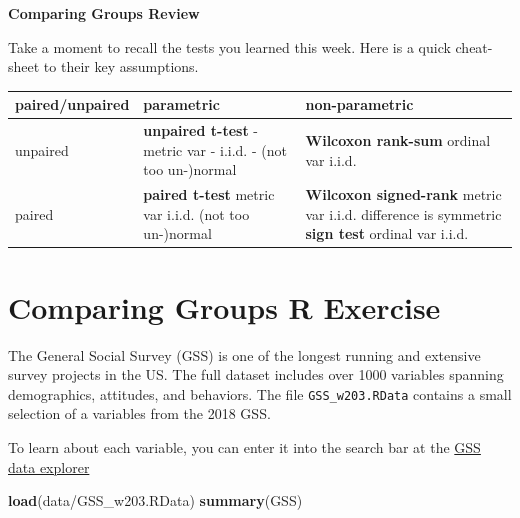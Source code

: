 \documentclass[
]{book}
\newenvironment{Shaded}{\begin{snugshade}}{\end{snugshade}}
\newcommand{\FunctionTok}[1]{\textcolor[rgb]{0.13,0.29,0.53}{\textbf{#1}}}
\newcommand{\NormalTok}[1]{#1}
\newcommand{\StringTok}[1]{\textcolor[rgb]{0.31,0.60,0.02}{#1}}
\theoremstyle{definition}
\theoremstyle{definition}
\theoremstyle{definition}
\theoremstyle{definition}
\theoremstyle{remark}
\begin{document}
\textbf{Comparing Groups Review}

Take a moment to recall the tests you learned this week. Here is a quick cheat-sheet to their key assumptions.

\begin{longtable}[]{@{}
  >{\raggedright\arraybackslash}p{}
  >{\raggedright\arraybackslash}p{}
  >{\raggedright\arraybackslash}p{}@{}}
\toprule\noalign{}
\begin{minipage}[b]{\linewidth}\raggedright
paired/unpaired
\end{minipage} & \begin{minipage}[b]{\linewidth}\raggedright
parametric
\end{minipage} & \begin{minipage}[b]{\linewidth}\raggedright
non-parametric
\end{minipage} \\
\midrule\noalign{}
\endhead
\bottomrule\noalign{}
\endlastfoot
unpaired & \textbf{unpaired t-test} - metric var - i.i.d. - (not too un-)normal & \textbf{Wilcoxon rank-sum} ordinal var i.i.d.  \\
paired & \textbf{paired t-test} metric var i.i.d. (not too un-)normal & \textbf{Wilcoxon signed-rank} metric var i.i.d. difference is symmetric \textbf{sign test} ordinal var i.i.d. \\
\end{longtable}

\section{Comparing Groups R Exercise}\label{comparing-groups-r-exercise}

The General Social Survey (GSS) is one of the longest running and extensive survey projects in the US. The full dataset includes over 1000 variables spanning demographics, attitudes, and behaviors. The file \texttt{GSS\_w203.RData} contains a small selection of a variables from the 2018 GSS.

To learn about each variable, you can enter it into the search bar at the \href{https://gssdataexplorer.norc.org/variables/vfilter}{GSS data explorer}

\begin{Shaded}
\begin{Highlighting}[]
\FunctionTok{load}\NormalTok{(}\StringTok{\textquotesingle{}data/GSS\_w203.RData\textquotesingle{}}\NormalTok{)}
\FunctionTok{summary}\NormalTok{(GSS)}
\end{Highlighting}
\end{Shaded}
\end{document}
